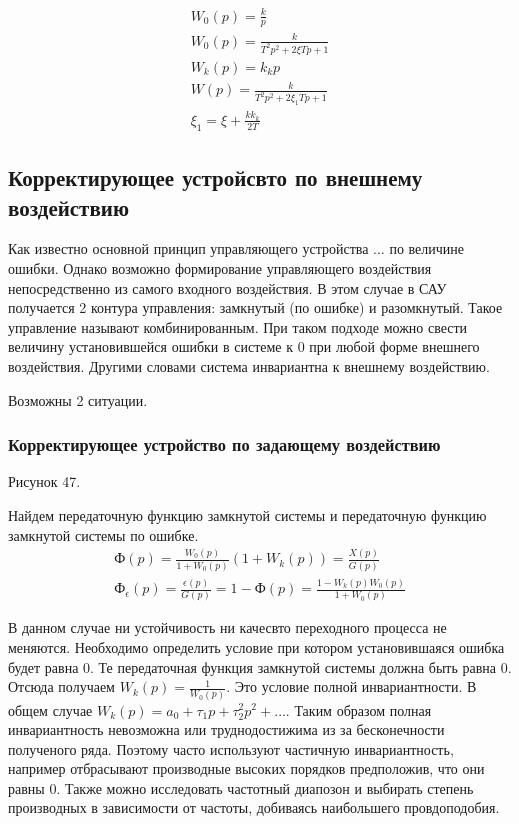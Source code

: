\begin{align*}
	W_0(p)=\frac{k}p \\
	W_0(p)=\frac{k}{T^2p^2+2\xi{}Tp+1} \\
	W_k(p)=k_kp	 \\
	W(p)=\frac{k}{T^2p^2+2\xi_1Tp+1} \\
	\xi_1=\xi+\frac{kk_k}{2T}
\end{align*}

\subsection{Корректирующее устройсвто по внешнему воздействию}
Как известно основной принцип управляющего устройства ... по величине ошибки. Однако возможно формирование управляющего воздействия непосредственно из самого входного воздействия. В этом случае в САУ получается 2 контура управления: замкнутый (по ошибке) и разомкнутый. Такое управление называют комбинированным. При таком подходе можно свести величину установившейся ошибки в системе к 0 при любой форме внешнего воздействия. Другими словами система инвариантна к внешнему воздействию.

Возможны 2 ситуации.
\subsubsection{Корректирующее устройство по задающему воздействию}
Рисунок 47.

Найдем передаточную функцию замкнутой системы и передаточную функцию замкнутой системы по ошибке.
\begin{align*}
	\text{Ф}(p)=\frac{W_0(p)}{1+W_0(p)}(1+W_k(p))=\frac{X(p)}{G(p)} \\
	\text{Ф}_{\epsilon}(p)=\frac{\epsilon(p)}{G(p)}=1-\text{Ф}(p)=\frac{1-W_k(p)W_0(p)}{1+W_0(p)}
\end{align*}

В данном случае ни устойчивость ни качесвто переходного процесса не меняются. Необходимо определить условие при котором установившаяся ошибка будет равна 0. Те передаточная функция замкнутой системы должна быть равна 0. Отсюда получаем $W_k(p)=\frac1{W_0(p)}$. Это условие полной инвариантности. В общем случае $W_k(p)=a_0+\tau_1p+\tau^2_2p^2+\ldots$. Таким образом полная инвариантность невозможна или труднодостижима из за бесконечности полученого ряда. Поэтому часто используют частичную инвариантность, например отбрасывают производные высоких порядков предположив, что они равны 0. Также можно исследовать частотный диапозон и выбирать степень производных в зависимости от частоты, добиваясь наибольшего провдоподобия.

